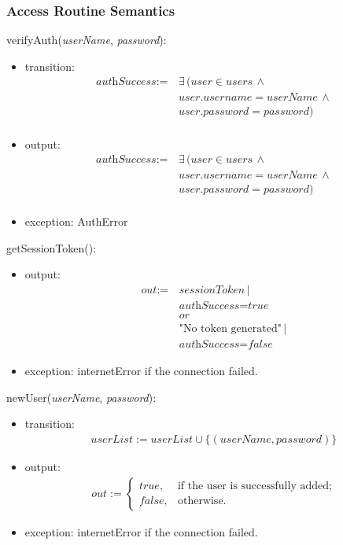 \documentclass[12pt, titlepage]{article}
\begin{document}
\subsubsection{Access Routine Semantics}

\noindent verifyAuth(\textit{userName}, \textit{password}):
\begin{itemize}
\item transition: 
\begin{align*}
\textit{authSuccess} := &\, \exists \, (\textit{user} \in \textit{users} \, \land \\
&\, \textit{user.username} = \textit{userName} \, \land \\
&\, \textit{user.password} = \textit{password}) \\
\end{align*}
\item output: 
\begin{align*}
\textit{authSuccess} := &\, \exists \, (\textit{user} \in \textit{users} \, \land \\
&\, \textit{user.username} = \textit{userName} \, \land \\
&\, \textit{user.password} = \textit{password}) \\
\end{align*}

\item exception: AuthError
\end{itemize}

\noindent getSessionToken():
\begin{itemize}
\item output: 
\begin{align*}
\textit{out} := &\, \textit{sessionToken} \, | \\
&\, \textit{authSuccess} = \textit{true} \\
&\, \textit{or} \\
&\, \text{"No token generated"} \, | \\
&\, \textit{authSuccess} = \textit{false}
\end{align*}

\item exception: internetError if the connection failed.
\end{itemize}
\noindent newUser(\textit{userName}, \textit{password}):
\begin{itemize}
\item transition: 
\begin{align*}
userList := userList \cup \{(userName, password)\}
\end{align*}

\item output: 
\begin{align*}
out := \begin{cases}
true, & \text{if the user is successfully added;} \\
false, & \text{otherwise.}
\end{cases}
\end{align*}


\item exception: internetError if the connection failed.
\end{itemize}
\end{document}
